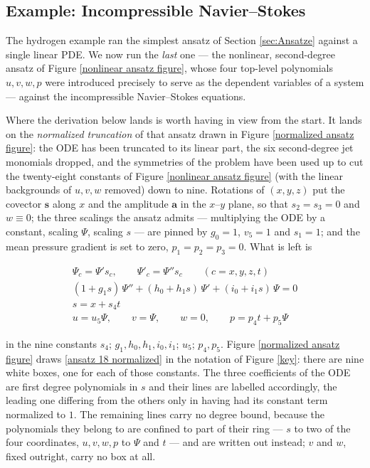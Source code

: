 \documentclass{article}
\theoremstyle{definition}
\theoremstyle{plain}
\begin{document}
\begin{nsexample}
\section{Example: Incompressible Navier--Stokes}
\label{sec:NavierStokes}

The hydrogen example ran the simplest ansatz of Section \ref{sec:Ansatze}
against a single linear PDE.  We now run the {\it last} one --- the nonlinear,
second-degree ansatz of Figure \ref{nonlinear ansatz figure}, whose four
top-level polynomials $u,v,w,p$ were introduced precisely to serve as the
dependent variables of a system --- against the incompressible Navier--Stokes
equations.

Where the derivation below lands is worth having in view from the start.  It
lands on the {\it normalized truncation} of that ansatz drawn in Figure
\ref{normalized ansatz figure}: the ODE has been truncated to its linear part,
the six second-degree jet monomials dropped, and the symmetries of the problem
have been used up to cut the twenty-eight constants of Figure
\ref{nonlinear ansatz figure} (with the linear backgrounds of $u,v,w$ removed)
down to nine.  Rotations of $(x,y,z)$ put the covector $\mathbf{s}$ along $x$
and the amplitude $\mathbf{a}$ in the $x$--$y$ plane, so that $s_2 = s_3 = 0$
and $w \equiv 0$; the three scalings the ansatz admits --- multiplying the ODE
by a constant, scaling $\Psi$, scaling $s$ --- are pinned by $g_0 = 1$,
$v_5 = 1$ and $s_1 = 1$; and the mean pressure gradient is set to zero,
$p_1 = p_2 = p_3 = 0$.  What is left is

\begin{equation}
\label{ansatz 18 normalized}
\begin{gathered}
\Psi_c = \Psi' s_c , \qquad \Psi'_c = \Psi'' s_c \qquad (c = x,y,z,t) \\
(1 + g_1 s)\,\Psi'' + (h_0 + h_1 s)\,\Psi' + (i_0 + i_1 s)\,\Psi = 0 \\
s = x + s_4 t \\
u = u_5 \Psi , \qquad v = \Psi , \qquad w = 0 , \qquad p = p_4 t + p_5 \Psi
\end{gathered}
\end{equation}

\noindent
in the nine constants $s_4$; $g_1, h_0, h_1, i_0, i_1$; $u_5$; $p_4, p_5$.
Figure \ref{normalized ansatz figure} draws \eqref{ansatz 18 normalized} in the
notation of Figure \ref{key}: there are nine white boxes, one for each of those
constants.  The three coefficients of the ODE are first degree polynomials in
$s$ and their lines are labelled accordingly, the leading one differing from
the others only in having had its constant term normalized to $1$.  The
remaining lines carry no degree bound, because the polynomials they belong to
are confined to part of their ring --- $s$ to two of the four coordinates,
$u,v,w,p$ to $\Psi$ and $t$ --- and are written out instead; $v$ and $w$, fixed
outright, carry no box at all.


\end{nsexample}
\end{document}
